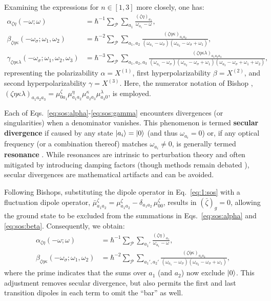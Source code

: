 \documentclass[12pt,a4paper]{article}
\begin{document}
Examining the expressions for $n\in[1,3]$ more closely, one has:
\begin{align}
	\alpha_{\zeta\eta}(-\omega;\omega) &= \hbar^{-1} \sum_\mathcal{P} \sum_{a_1} \frac{(\zeta\eta)_{a_1}}{\omega_{a_1} - \omega},\label{eq:sos:alpha}\\
	\beta_{\zeta\eta\kappa}(-\omega_\sigma; \omega_1, \omega_2) &= \hbar^{-2} \sum_\mathcal{P} \sum_{a_1,a_2} \frac{(\zeta\eta\kappa)_{a_1 a_2}}{(\omega_{a_1} - \omega_\sigma)(\omega_{a_2} - \omega_\sigma + \omega_1)},\label{eq:sos:beta}\\
	\gamma_{\zeta\eta\kappa\lambda}(-\omega_\sigma; \omega_1, \omega_2, \omega_3) &= \hbar^{-3} \sum_\mathcal{P} \sum_{a_1, a_2, a_3} \frac{(\zeta\eta\kappa\lambda)_{a_1 a_2 a_3}}{(\omega_{a_1} - \omega_\sigma)(\omega_{a_2} - \omega_\sigma + \omega_1)(\omega_{a_3} - \omega_\sigma + \omega_1 + \omega_2)},\label{eq:sos:gamma}
\end{align}
representing the polarizability $\alpha = X^{(1)}$, first hyperpolarizability $\beta = X^{(2)}$, and second hyperpolarizability $\gamma = X^{(3)}$. Here, the numerator notation of Bishop \cite{bishopExplicitNondivergentFormulas1994}, $(\zeta\eta\kappa\lambda)_{a_1 a_2 a_3} = \mu_{0 a_1}^\zeta \mu_{a_1 a_2}^\eta \mu_{a_2 a_3}^\kappa \mu_{a_3 0}^\lambda$, is employed.

Each of Eqs.~\eqref{eq:sos:alpha}-\eqref{eq:sos:gamma} encounters divergences (or singularities) when a denominator vanishes. This phenomenon is termed \textbf{secular divergence} if caused by any state $\ket{a_i} = \ket{0}$ (and thus $\omega_{a_i} = 0$) or, if any optical frequency (or a combination thereof) matches $\omega_{a_i} \neq 0$, is generally termed \textbf{resonance} \cite{bishopExplicitNondivergentFormulas1994}. While resonances are intrinsic to perturbation theory and often mitigated by introducing damping factors (though methods remain debated \cite{campoPracticalModelFirst2012a}), secular divergences are mathematical artifacts and can be avoided. 

Following Bishops, substituting the dipole operator in Eq.~\eqref{eq:1:sos} with a fluctuation dipole operator, $\bar{\mu}^\zeta_{a_1 a_2} = \mu^\zeta_{a_1 a_2} - \delta_{a_1 a_2}\, \mu_{00}^\zeta$, results in $(\bar{\zeta})_g = 0$, allowing the ground state to be excluded from the summations in Eqs.~\eqref{eq:sos:alpha} and \eqref{eq:sos:beta}. Consequently, we obtain:
\begin{align*}
	\alpha_{\zeta\eta}(-\omega; \omega) &= \hbar^{-1} \sum_\mathcal{P} \sum_{a_1'} \frac{(\zeta\eta)_{a_1}}{\omega_{a_1} - \omega},\\
	\beta_{\zeta\eta\kappa}(-\omega_\sigma; \omega_1, \omega_2) &= \hbar^{-2} \sum_\mathcal{P} \sum_{a_1', a_2'} \frac{(\zeta\bar{\eta}\kappa)_{a_1 a_2}}{(\omega_{a_1} - \omega_\sigma)(\omega_{a_2} - \omega_\sigma + \omega_1)},
\end{align*}
where the prime indicates that the sums over $a_1$ (and $a_2$) now exclude $\ket{0}$. This adjustment removes secular divergence, but also permits the first and last transition dipoles in each term to omit the ``bar'' as well.
\end{document}
